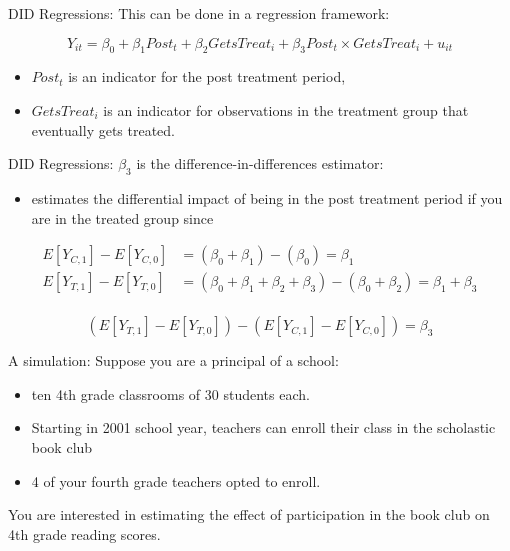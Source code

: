 \documentclass[
  ignorenonframetext,
]{beamer}
\providecommand{\tightlist}{%
  \setlength{\itemsep}{0pt}\setlength{\parskip}{0pt}}
\begin{document}
\begin{frame}{DID Regressions:}
\protect\hypertarget{did-regressions}{}
This can be done in a regression framework:

\[
Y_{it}=\beta_0+\beta_1 Post_t+\beta_2 GetsTreat_i+\beta_3 Post_t\times GetsTreat_i+u_{it}
\]

\begin{itemize}
\item
  \(Post_t\) is an indicator for the post treatment period,
\item
  \(GetsTreat_i\) is an indicator for observations in the treatment
  group that eventually gets treated.
\end{itemize}
\end{frame}

\begin{frame}{DID Regressions:}
\protect\hypertarget{did-regressions-1}{}
\(\beta_3\) is the difference-in-differences estimator:

\begin{itemize}
\tightlist
\item
  estimates the differential impact of being in the post treatment
  period if you are in the treated group since
\end{itemize}

\small

\[
\begin{aligned}
E[Y_{C,1}]-E[Y_{C,0}]&=(\beta_0+\beta_1)-(\beta_0)=\beta_1\\
E[Y_{T,1}]-E[Y_{T,0}]&=(\beta_0+\beta_1+\beta_2+\beta_3)-(\beta_0+\beta_2)=\beta_1+\beta_3\\
\end{aligned}
\]

\[
(E[Y_{T,1}]-E[Y_{T,0}])-(E[Y_{C,1}]-E[Y_{C,0}])=\beta_3
\]
\end{frame}

\begin{frame}{A simulation:}
\protect\hypertarget{a-simulation}{}
Suppose you are a principal of a school:

\begin{itemize}
\item
  ten 4th grade classrooms of 30 students each.
\item
  Starting in 2001 school year, teachers can enroll their class in the
  scholastic book club
\item
  4 of your fourth grade teachers opted to enroll.
\end{itemize}

You are interested in estimating the effect of participation in the book
club on 4th grade reading scores.
\end{frame}
\end{document}
